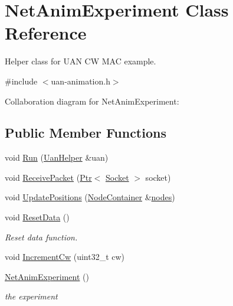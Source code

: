 \hypertarget{classNetAnimExperiment}{}\section{Net\+Anim\+Experiment Class Reference}
\label{classNetAnimExperiment}


Helper class for U\+AN CW M\+AC example.  




{\ttfamily \#include $<$uan-\/animation.\+h$>$}



Collaboration diagram for Net\+Anim\+Experiment\+:
\subsection*{Public Member Functions}
\begin{DoxyCompactItemize}
\item 
void \hyperlink{classNetAnimExperiment_a63a699997d753ea33b4367ccad6088a3}{Run} (\hyperlink{classns3_1_1UanHelper}{Uan\+Helper} \&uan)
\item 
void \hyperlink{classNetAnimExperiment_a94fa3d1a8048f3b0a4f6cc9fbbda55c1}{Receive\+Packet} (\hyperlink{classns3_1_1Ptr}{Ptr}$<$ \hyperlink{classns3_1_1Socket}{Socket} $>$ socket)
\item 
void \hyperlink{classNetAnimExperiment_ac34d4ab03728c026626625a291284658}{Update\+Positions} (\hyperlink{classns3_1_1NodeContainer}{Node\+Container} \&\hyperlink{visualizer-ideas_8txt_a3e1b3808014a2c68ab0cd0182e041be2}{nodes})
\item 
void \hyperlink{classNetAnimExperiment_a9ddd0a3abc2ce827381a1c7fa9fd2e32}{Reset\+Data} ()
\begin{DoxyCompactList}\small\item\em Reset data function. \end{DoxyCompactList}\item 
void \hyperlink{classNetAnimExperiment_a12db4bf2df8db6997ea686d52081fe7e}{Increment\+Cw} (uint32\+\_\+t cw)
\item 
\hyperlink{classNetAnimExperiment_aa49c5a9d79dd0f419faa9ec6b879b939}{Net\+Anim\+Experiment} ()
\begin{DoxyCompactList}\small\item\em the experiment \end{DoxyCompactList}\end{DoxyCompactItemize}

